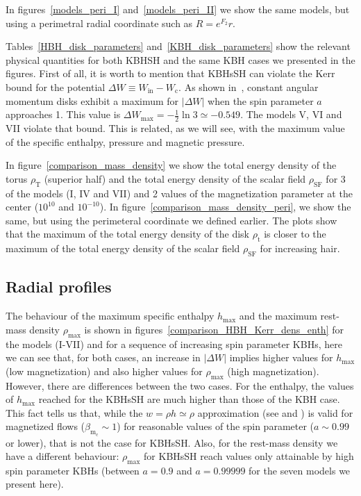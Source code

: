 \documentclass[twocolumn,aps,showpacs,showkeys,prd,superscriptaddress,byrevtex, amsmath]{revtex4-1}
\begin{document}
In figures~\ref{models_peri_I} and~\ref{models_peri_II} we show the same models, but using a perimetral radial coordinate such as $R = e^{F_2} r$. 


Tables~\ref{HBH_disk_parameters} and~\ref{KBH_disk_parameters} show the relevant physical quantities for both KBHSH and the same KBH cases we presented in the figures. First of all, it is worth to mention that KBHsSH can violate the Kerr bound for the potential $\Delta W \equiv W_{\mathrm{in}} - W_{\mathrm{c}}$. As shown in~\cite{Abramowicz:1978}, constant angular momentum disks exhibit a maximum for $|\Delta W|$ when the spin parameter $a$ approaches 1. This value is $\Delta W_{\mathrm{max}} = -\frac{1}{2} \ln 3 \simeq -0.549$. The models V, VI and VII violate that bound. This is related, as we will see, with the maximum value of the specific enthalpy, pressure and magnetic pressure.

In figure~\ref{comparison_mass_density} we show the total energy density of the torus $\rho_{\mathrm{T}}$ (superior half) and the total energy density of the scalar field $\rho_{\mathrm{SF}}$ for 3 of the models (I, IV and VII) and 2 values of the magnetization parameter at the center ($10^{10}$ and $10^{-10}$). In figure~\ref{comparison_mass_density_peri}, we show the same, but using the perimeteral coordinate we defined earlier. The plots show that the maximum of the total energy density of the disk $\rho_{\mathrm{t}}$ is closer to the maximum of the total energy density of the scalar field $\rho_{\mathrm{SF}}$ for increasing hair.

\subsection{Radial profiles}


The behaviour of the maximum specific enthalpy $h_{\mathrm{max}}$ and the maximum rest-mass density $\rho_{\mathrm{max}}$ is shown in figures~\ref{comparison_HBH_Kerr_dens_enth} for the models (I-VII) and for a sequence of increasing spin parameter KBHs, here we can see that, for both cases, an increase in $|\Delta W|$ implies higher values for $h_{\mathrm{max}}$ (low magnetization) and also higher values for $\rho_{\mathrm{max}}$ (high magnetization). However, there are differences between the two cases. For the enthalpy, the values of $h_{\mathrm{max}}$ reached for the KBHsSH are much higher than those of the KBH case. This fact tells us that, while the $w = \rho h \simeq \rho$ approximation (see \cite{Komissarov:2006} and \cite{Gimeno-Soler:2017}) is valid for magnetized flows ($\beta_{\mathrm{m_c}} \sim 1$) for reasonable values of the spin parameter ($a \sim 0.99$ or lower), that is not the case for KBHsSH. Also, for the rest-mass density we have a different behaviour: $\rho_{\mathrm{max}}$ for KBHsSH reach values only attainable by high spin parameter KBHs (between $a = 0.9$ and $a = 0.99999$ for the seven models we present here).
\end{document}
